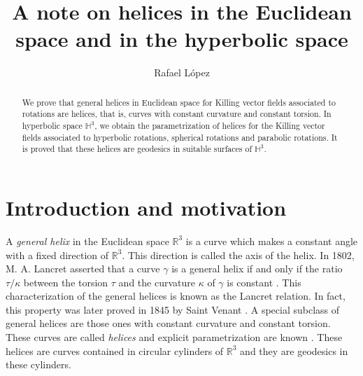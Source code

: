 \documentclass[a4paper,12pt]{amsart}
\theoremstyle{definition}
\def\r{\mathbb R}
\def\h{\mathbb H}
\begin{document}
\title{A note on helices in the Euclidean space and in the hyperbolic space}
\author{Rafael L\'opez}
\address{ Department of Geometry and Topology. University of Granada. 18071  Granada, Spain}

\begin{abstract} 
We   prove that general helices in Euclidean space for Killing vector fields associated to rotations are helices,  that is, curves with constant curvature and constant torsion. In hyperbolic space $\h^3$, we obtain the parametrization of helices for the Killing vector fields associated to hyperbolic rotations, spherical rotations and parabolic rotations. It is proved that these helices are geodesics in suitable surfaces of $\h^3$. 

\end{abstract}

\maketitle 

\section{Introduction and motivation}
  

A {\it general helix} in the Euclidean space $\r^3$ is a curve which makes a constant angle with a fixed direction of $\r^3$. This direction is called the axis of the helix. In  1802, M. A. Lancret asserted that a curve $\gamma$ is a general helix if and only if   the ratio   $\tau/\kappa$ between the torsion $\tau$ and the curvature $\kappa$ of $\gamma$ is constant \cite{la}. This characterization of the general helices is known as the Lancret relation. In fact, this property was later  proved    in 1845 by   Saint Venant \cite{sv}.   A special subclass of general helices are  those ones with constant curvature and constant torsion. These curves are called   {\it helices} and explicit parametrization are known \cite{gra}. These helices are curves contained in circular cylinders of $\r^3$ and they are geodesics in these cylinders. 
\end{document}
